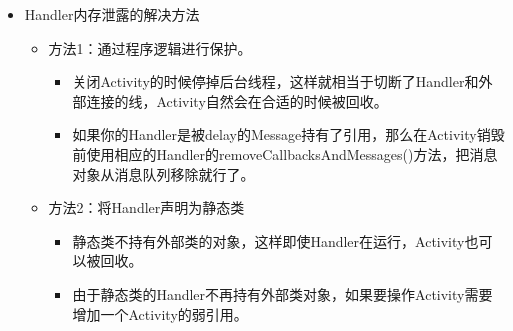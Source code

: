 \documentclass[9pt, b5paper]{article}
\begin{document}
\begin{itemize}
\begin{itemize}
\end{itemize}
\item Handler内存泄露的解决方法
\begin{itemize}
\item 方法1：通过程序逻辑进行保护。
\begin{itemize}
\item 关闭Activity的时候停掉后台线程，这样就相当于切断了Handler和外部连接的线，Activity自然会在合适的时候被回收。
\item 如果你的Handler是被delay的Message持有了引用，那么在Activity销毁前使用相应的Handler的removeCallbacksAndMessages()方法，把消息对象从消息队列移除就行了。
\end{itemize}
\item 方法2：将Handler声明为静态类
\begin{itemize}
\item 静态类不持有外部类的对象，这样即使Handler在运行，Activity也可以被回收。
\item 由于静态类的Handler不再持有外部类对象，如果要操作Activity需要增加一个Activity的弱引用。
\end{itemize}
\end{itemize}
\end{itemize}
\end{document}
